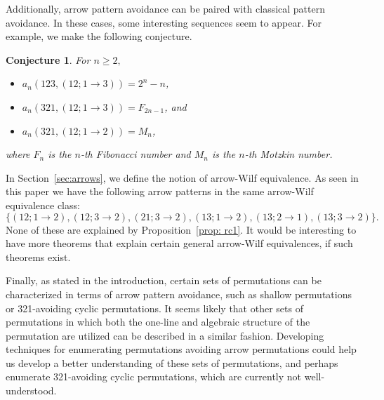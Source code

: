 \documentclass[11pt]{article}
\newtheorem{conjecture}[theorem]{Conjecture}
\theoremstyle{definition}
\begin{document}
Additionally, arrow pattern avoidance can be paired with classical pattern avoidance. In these cases, some interesting sequences seem to appear. For example, we make the following conjecture. 

\begin{conjecture}
    For $n\geq 2,$
    \begin{itemize}
        \item $a_n(123, (12; 1 \to 3)) = 2^{n}-n$,
        \item $a_n(321,(12; 1 \to 3)) = F_{2n-1}$, and 
        \item  $a_n(321,(12;1 \to 2)) = M_n$,
    \end{itemize}
     where $F_n$ is the $n$-th Fibonacci number and $M_n$ is the $n$-th Motzkin number.
\end{conjecture}


In Section~\ref{sec:arrows}, we define the notion of arrow-Wilf equivalence. As seen in this paper we have the following arrow patterns in the same arrow-Wilf equivalence class: 
\[
\{(12;1\to2), (12;3\to2), (21;3\to2),(13;1\to2), (13;2\to1),(13;3\to2)\}. 
\]
None of these are explained by Proposition~\ref{prop: rc1}. It would be interesting to have more theorems that explain certain general arrow-Wilf equivalences, if such theorems exist.

Finally, as stated in the introduction, certain sets of permutations can be characterized in terms of arrow pattern avoidance, such as shallow permutations or 321-avoiding cyclic permutations. It seems likely that other sets of permutations in which both the one-line and algebraic structure of the permutation are utilized can be described in a similar fashion. Developing techniques for enumerating permutations avoiding arrow permutations could help us develop a better understanding of these sets of permutations, and perhaps enumerate 321-avoiding cyclic permutations, which are currently not well-understood.
\end{document}
